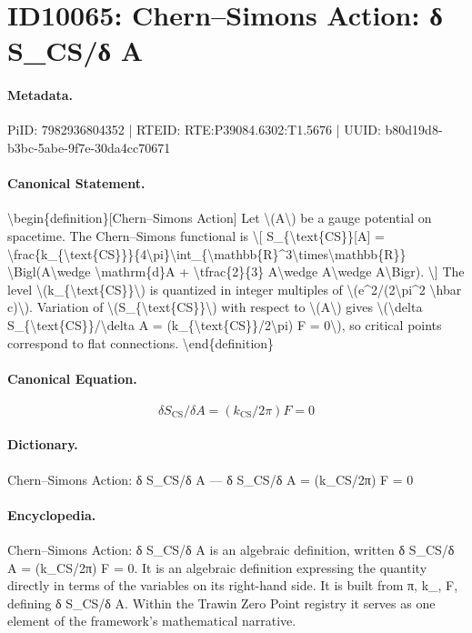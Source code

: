 \section*{ID10065: Chern–Simons Action: δ S\_CS/δ A}
\paragraph{Metadata.}
PiID: 7982936804352 | RTEID: RTE:P39084.6302:T1.5676 | UUID: b80d19d8-b3bc-5abe-9f7e-30da4cc70671

\paragraph{Canonical Statement.}
\textbackslash{}begin\{definition\}[Chern–Simons Action] Let \textbackslash{}(A\textbackslash{}) be a gauge potential on spacetime. The Chern–Simons functional is \textbackslash{}[ S\_\{\textbackslash{}text\{CS\}\}[A] = \textbackslash{}frac\{k\_\{\textbackslash{}text\{CS\}\}\}\{4\textbackslash{}pi\}\textbackslash{}int\_\{\textbackslash{}mathbb\{R\}\textasciicircum{}3\textbackslash{}times\textbackslash{}mathbb\{R\}\} \textbackslash{}Bigl(A\textbackslash{}wedge \textbackslash{}mathrm\{d\}A + \textbackslash{}tfrac\{2\}\{3\} A\textbackslash{}wedge A\textbackslash{}wedge A\textbackslash{}Bigr). \textbackslash{}] The level \textbackslash{}(k\_\{\textbackslash{}text\{CS\}\}\textbackslash{}) is quantized in integer multiples of \textbackslash{}(e\textasciicircum{}2/(2\textbackslash{}pi\textasciicircum{}2 \textbackslash{}hbar c)\textbackslash{}). Variation of \textbackslash{}(S\_\{\textbackslash{}text\{CS\}\}\textbackslash{}) with respect to \textbackslash{}(A\textbackslash{}) gives \textbackslash{}(\textbackslash{}delta S\_\{\textbackslash{}text\{CS\}\}/\textbackslash{}delta A = (k\_\{\textbackslash{}text\{CS\}\}/2\textbackslash{}pi) F = 0\textbackslash{}), so critical points correspond to flat connections. \textbackslash{}end\{definition\}

\paragraph{Canonical Equation.}
\[
\delta S_{\text{CS}}/\delta A = (k_{\text{CS}}/2\pi) F = 0
\]

\paragraph{Dictionary.}
Chern–Simons Action: δ S\_CS/δ A — δ S\_CS/δ A = (k\_CS/2π) F = 0

\paragraph{Encyclopedia.}
Chern–Simons Action: δ S\_CS/δ A is an algebraic definition, written δ S\_CS/δ A = (k\_CS/2π) F = 0. It is an algebraic definition expressing the quantity directly in terms of the variables on its right-hand side. It is built from π, k\_, F, defining δ S\_CS/δ A. Within the Trawin Zero Point registry it serves as one element of the framework's mathematical narrative.
